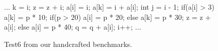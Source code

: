 \begin{figure}[h]
\centering
\begin{minipage}{0.70\textwidth}
\begin{javacode}
...
k = i;
z = z + i;
a[i] = i;
a[k] = i + a[i];
int j = i - 1;
if(a[i] > 3) {
    a[k] = p * 10;
    if(p > 20) {
        a[i] = p * 20;
    } else {
        a[k] = p * 30;
    }
    z = z + a[i];
} else {
    a[i] = p * 40;
}
q = q + a[i];
i++;
...
\end{javacode}
\end{minipage}
\caption{Test6 from our handcrafted benchmarks.}
\label{fig:Example6}
\end{figure}

